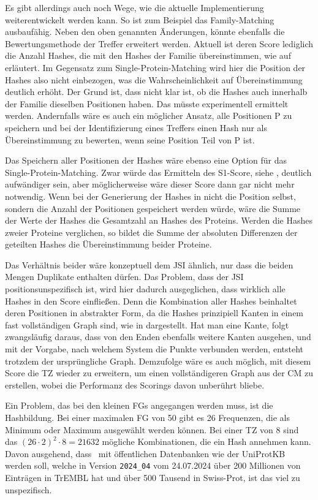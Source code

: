         Es gibt allerdings auch noch Wege, wie die aktuelle Implementierung weiterentwickelt werden kann. So ist zum Beispiel das Family-Matching ausbaufähig. Neben den oben genannten Änderungen, könnte ebenfalls die Bewertungsmethode der Treffer erweitert werden. Aktuell ist deren Score lediglich die Anzahl Hashes, die mit den Hashes der Familie übereinstimmen, wie auf  erläutert. Im Gegensatz zum Single-Protein-Matching wird hier die Position der Hashes also nicht einbezogen, was die Wahrscheinlichkeit auf Übereinstimmung deutlich erhöht. Der Grund ist, dass nicht klar ist, ob die Hashes auch innerhalb der Familie dieselben Positionen haben. Das müsste experimentell ermittelt werden. Andernfalls wäre es auch ein möglicher Ansatz, alle Positionen P zu speichern und bei der Identifizierung eines Treffers einen Hash nur als Übereinstimmung zu bewerten, wenn seine Position Teil von P ist.

        Das Speichern aller Positionen der Hashes wäre ebenso eine Option für das Single-Protein-Matching. Zwar würde das Ermitteln des S1-Score, siehe , deutlich aufwändiger sein, aber möglicherweise wäre dieser Score dann gar nicht mehr notwendig. Wenn bei der Generierung der Hashes in  nicht die Position selbst, sondern die Anzahl der Positionen gespeichert werden würde, wäre die Summe der Werte der Hashes die Gesamtzahl an Hashes des Proteins. Werden die Hashes zweier Proteine verglichen, so bildet die Summe der absoluten Differenzen der geteilten Hashes die Übereinstimmung beider Proteine.

        Das Verhältnis beider wäre konzeptuell dem \ac{JSI} ähnlich, nur dass die beiden Mengen Duplikate enthalten dürfen. Das Problem, dass der \ac{JSI} positionsunspezifisch ist, wird hier dadurch ausgeglichen, dass wirklich alle Hashes in den Score einfließen. Denn die Kombination aller Hashes beinhaltet deren Positionen in abstrakter Form, da die Hashes prinzipiell Kanten in einem fast vollständigen Graph sind, wie in  dargestellt. Hat man eine Kante, folgt zwangsläufig daraus, dass von den Enden ebenfalls weitere Kanten ausgehen, und mit der Vorgabe, nach welchem System die Punkte verbunden werden, entsteht trotzdem der ursprüngliche Graph. Demzufolge wäre es auch möglich, mit diesem Score die \ac{TZ} wieder zu erweitern, um einen vollständigeren Graph aus der \acf{CM} zu erstellen, wobei die Performanz des Scorings davon unberührt bliebe.

        Ein Problem, das bei den kleinen \acp{FG} angegangen werden muss, ist die Hashbildung. Bei einer maximalen \ac{FG} von 50 gibt es 26 Frequenzen, die als Minimum oder Maximum ausgewählt werden können. Bei einer \ac{TZ} von 8 sind das ${(26 \cdot 2)}^{2} \cdot 8 = 21632$ mögliche Kombinationen, die ein Hash annehmen kann. Davon ausgehend, dass \protfin\ mit öffentlichen Datenbanken wie der UniProtKB \autocite{uniprot} werden soll, welche in Version \texttt{2024\_04} vom 24.07.2024 über 200 Millionen von Einträgen in TrEMBL hat und über 500 Tausend in Swiss-Prot, ist das viel zu unspezifisch.

